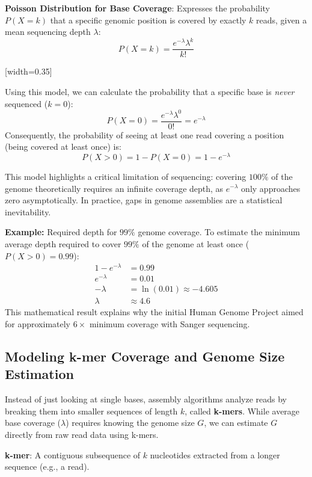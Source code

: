 \begin{important}
    \textbf{Poisson Distribution for Base Coverage}: Expresses the probability $P(X = k)$ that a specific genomic position is covered by exactly $k$ reads, given a mean sequencing depth $\lambda$:
    \begin{equation} \label{eq:poisson}
    P(X = k) = \frac{e^{-\lambda} \lambda^k}{k!}
    \end{equation}
\end{important}

[width=0.35\textwidth]

Using this model, we can calculate the probability that a specific base is \textit{never} sequenced ($k=0$):
\[ P(X = 0) = \frac{e^{-\lambda} \lambda^0}{0!} = e^{-\lambda} \]
Consequently, the probability of seeing at least one read covering a position (being covered at least once) is:
\[ P(X > 0) = 1 - P(X = 0) = 1 - e^{-\lambda} \]

\sta This model highlights a critical limitation of sequencing: covering $100\%$ of the genome theoretically requires an infinite coverage depth, as $e^{-\lambda}$ only approaches zero asymptotically. In practice, gaps in genome assemblies are a statistical inevitability.

\textbf{Example:} Required depth for $99\%$ genome coverage.
To estimate the minimum average depth required to cover $99\%$ of the genome at least once ($P(X > 0) = 0.99$):
\begin{align*}
    1 - e^{-\lambda} &= 0.99 \\
    e^{-\lambda} &= 0.01 \\
    -\lambda &= \ln(0.01) \approx -4.605 \\
    \lambda &\approx 4.6
\end{align*}
This mathematical result explains why the initial Human Genome Project aimed for approximately $6\times$ minimum coverage with Sanger sequencing.

\subsection{Modeling k-mer Coverage and Genome Size Estimation}
Instead of just looking at single bases, assembly algorithms analyze reads by breaking them into smaller sequences of length $k$, called \textbf{k-mers}. While average base coverage ($\lambda$) requires knowing the genome size $G$, we can estimate $G$ directly from raw read data using k-mers.

\begin{important}
    \textbf{k-mer}: A contiguous subsequence of $k$ nucleotides extracted from a longer sequence (e.g., a read).
\end{important}

